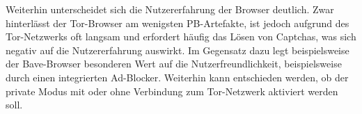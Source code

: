 Weiterhin unterscheidet sich die Nutzererfahrung der Browser deutlich.
Zwar hinterlässt der Tor-Browser am wenigsten PB-Artefakte, ist jedoch aufgrund des Tor-Netzwerks oft langsam und erfordert häufig das Lösen von Captchas, was sich negativ auf die Nutzererfahrung auswirkt.
Im Gegensatz dazu legt beispielsweise der Bave-Browser besonderen Wert auf die Nutzerfreundlichkeit, beispielsweise durch einen integrierten Ad-Blocker. Weiterhin kann entschieden werden, ob der private Modus mit oder ohne Verbindung zum Tor-Netzwerk aktiviert werden soll. \cite{Brave.}

%
%



